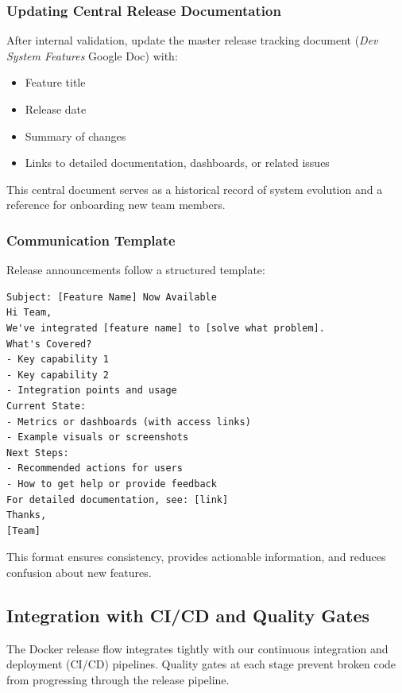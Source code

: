 \subsubsection{Updating Central Release Documentation}
After internal validation, update the master release tracking document
(\textit{Dev System Features} Google Doc) with:
\begin{itemize}
  \item Feature title

  \item Release date

  \item Summary of changes

  \item Links to detailed documentation, dashboards, or related issues
\end{itemize}
This central document serves as a historical record of system
evolution and a reference for onboarding new team members.
\subsubsection{Communication Template}
Release announcements follow a structured template:
\begin{verbatim}
Subject: [Feature Name] Now Available
Hi Team,
We've integrated [feature name] to [solve what problem].
What's Covered?
- Key capability 1
- Key capability 2
- Integration points and usage
Current State:
- Metrics or dashboards (with access links)
- Example visuals or screenshots
Next Steps:
- Recommended actions for users
- How to get help or provide feedback
For detailed documentation, see: [link]
Thanks,
[Team]
\end{verbatim}
This format ensures consistency, provides actionable information, and
reduces confusion about new features.
\subsection{Integration with CI/CD and Quality Gates}
The Docker release flow integrates tightly with our continuous integration
and deployment (CI/CD) pipelines. Quality gates at each stage prevent
broken code from progressing through the release pipeline.
